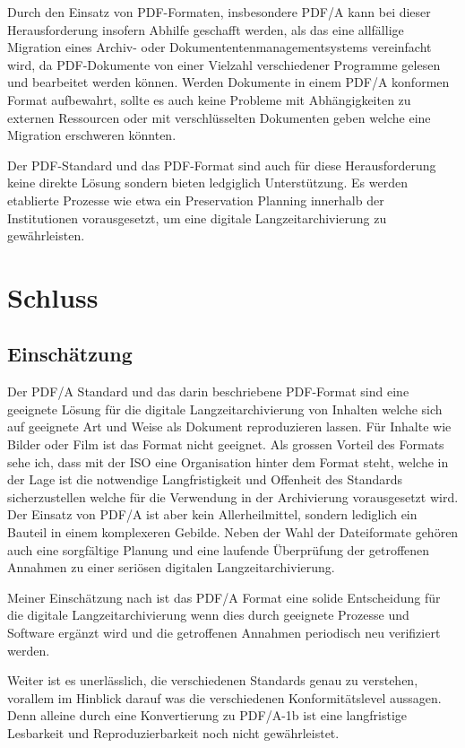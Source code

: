 \documentclass[a4paper,oneside, 12pt]{report}
\begin{document}
Durch den Einsatz von PDF-Formaten, insbesondere PDF/A kann bei dieser Herausforderung insofern Abhilfe geschafft werden, als das eine allfällige Migration eines Archiv- oder Dokumententenmanagementsystems vereinfacht wird, da PDF-Dokumente von einer Vielzahl verschiedener Programme gelesen und bearbeitet werden können. Werden Dokumente in einem PDF/A konformen Format aufbewahrt, sollte es auch keine Probleme mit Abhängigkeiten zu externen Ressourcen oder mit verschlüsselten Dokumenten geben welche eine Migration erschweren könnten.

Der PDF-Standard und das PDF-Format sind auch für diese Herausforderung keine direkte Lösung sondern bieten ledgiglich Unterstützung. Es werden etablierte Prozesse wie etwa ein Preservation Planning innerhalb der Institutionen vorausgesetzt, um eine digitale Langzeitarchivierung zu gewährleisten. \cite{pdfaorgsponsored}


\chapter{Schluss}\label{sec:schluss}
\section{Einschätzung}
Der PDF/A Standard und das darin beschriebene PDF-Format sind eine geeignete Lösung für die digitale Langzeitarchivierung von Inhalten welche sich auf geeignete Art und Weise als Dokument reproduzieren lassen. Für Inhalte wie Bilder oder Film ist das Format nicht geeignet. Als grossen Vorteil des Formats sehe ich, dass mit der \ac{ISO} eine Organisation hinter dem Format steht, welche in der Lage ist die notwendige Langfristigkeit und Offenheit des Standards sicherzustellen welche für die Verwendung in der Archivierung vorausgesetzt wird. Der Einsatz von PDF/A ist aber kein Allerheilmittel, sondern lediglich ein Bauteil in einem komplexeren Gebilde. Neben der Wahl der Dateiformate gehören auch eine sorgfältige Planung und eine laufende Überprüfung der getroffenen Annahmen zu einer seriösen digitalen Langzeitarchivierung. 

Meiner Einschätzung nach ist das PDF/A Format eine solide Entscheidung für die digitale Langzeitarchivierung wenn dies durch geeignete Prozesse und Software ergänzt wird und die getroffenen Annahmen periodisch neu verifiziert werden. 

Weiter ist es unerlässlich, die verschiedenen Standards genau zu verstehen, vorallem im Hinblick darauf was die verschiedenen Konformitätslevel aussagen. Denn alleine durch eine Konvertierung zu PDF/A-1b ist eine langfristige Lesbarkeit und Reproduzierbarkeit noch nicht gewährleistet.
\end{document}

